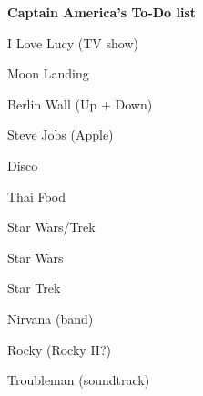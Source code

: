 \documentclass{article}
\newenvironment{checklist}{
  \begin{list}{}{}
  \setlength\itemsep{-.0em}
  \let\olditem\item
  \renewcommand\item{\olditem[\faSquareO]}
  \newcommand\itemchecked{\olditem[\faCheckSquareO]}
  \newcommand\itembad{\olditem[\faClose]}
  \newcommand\itemprogress{\olditem[\faSquare]}
}{
  \end{list}
}
\newcommand{\indentitem}{\setlength\itemindent{25pt}}
\begin{document}
\textbf{Captain America's To-Do list}
\begin{checklist}
	\item I Love Lucy (TV show)
	\itemchecked Moon Landing
	\itemchecked Berlin Wall (Up + Down)
	\item Steve Jobs (Apple)
	\item Disco
	\item Thai Food
	\itemprogress Star Wars/Trek
	{\indentitem\itemchecked Star Wars}
	{\indentitem\item Star Trek}
	\item Nirvana (band)
	\item Rocky (Rocky II?)
	\itembad Troubleman (soundtrack)
\end{checklist}
\end{document}
